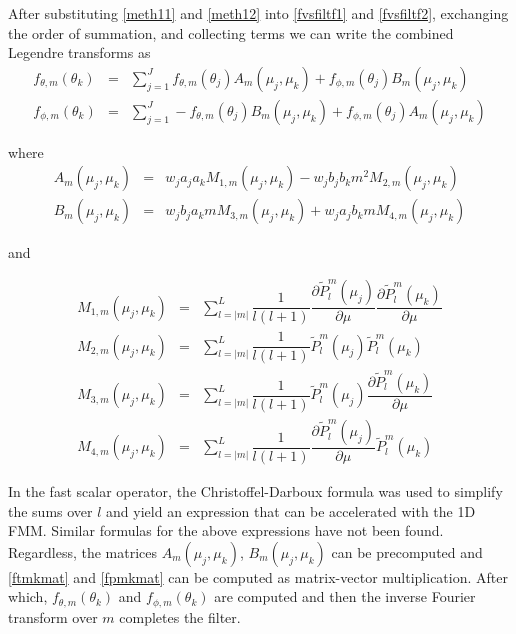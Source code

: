After substituting \eqref{meth11} and \eqref{meth12} into \eqref{fvsfiltf1} and \eqref{fvsfiltf2}, exchanging the order of summation, and collecting terms we can write the combined Legendre transforms as 
\begin{eqnarray}
f_{\theta,m}(\theta_k) &=& \sum_{j=1}^J f_{\theta,m}(\theta_j) A_m(\mu_j,\mu_k)  + f_{\phi,m}(\theta_j)  B_m(\mu_j,\mu_k) \label{ftmkmat} \\
f_{\phi,m}(\theta_k) &=& \sum_{j=1}^J - f_{\theta,m}(\theta_j) B_m(\mu_j,\mu_k)  + f_{\phi,m}(\theta_j)A_m(\mu_j,\mu_k) \label{fpmkmat}
\end{eqnarray}

where 
\begin{eqnarray}
A_m(\mu_j,\mu_k)  &=& w_j a_j a_k M_{1,m}(\mu_j,\mu_k) - w_j b_jb_k m^2 M_{2,m}(\mu_j,\mu_k)   \\
B_m(\mu_j,\mu_k)  &=& w_j b_j a_k m M_{3,m}(\mu_j,\mu_k) + w_j a_jb_k m M_{4,m}(\mu_j,\mu_k) 
\end{eqnarray}

and

\begin{eqnarray}
M_{1,m}(\mu_j,\mu_k) &=& \sum_{l=\vert m \vert }^L \dfrac{1}{l(l+1)} \dfrac{\partial \widetilde{P}_l^m(\mu_j)}{\partial\mu}\dfrac{\partial \widetilde{P}_l^m(\mu_k)}{\partial\mu}  \\
M_{2,m}(\mu_j,\mu_k)  &=& \sum_{l=\vert m \vert }^L \dfrac{1}{l(l+1)} \widetilde{P}_l^m(\mu_j)\widetilde{P}_l^m(\mu_k)  \\
M_{3,m}(\mu_j,\mu_k)  &=& \sum_{l=\vert m \vert }^L \dfrac{1}{l(l+1)} \widetilde{P}_l^m(\mu_j)\dfrac{\partial \widetilde{P}_l^m(\mu_k)}{\partial\mu}  \\
M_{4,m}(\mu_j,\mu_k)  &=& \sum_{l=\vert m \vert }^L \dfrac{1}{l(l+1)} \dfrac{\partial \widetilde{P}_l^m(\mu_j)}{\partial\mu} \widetilde{P}_l^m(\mu_k) 
\end{eqnarray}

In the fast scalar operator, the Christoffel-Darboux formula was used to simplify the sums over $l$ and yield an expression that can be accelerated with the 1D FMM.  Similar formulas for the above expressions have not been found.  Regardless, the matrices $A_m(\mu_j,\mu_k) $, $B_m(\mu_j,\mu_k) $ can be precomputed and \eqref{ftmkmat} and \eqref{fpmkmat} can be computed as matrix-vector multiplication. After which, $f_{\theta,m}(\theta_k)$ and $f_{\phi,m}(\theta_k)$ are computed and then the inverse Fourier transform over $m$ completes the filter.

